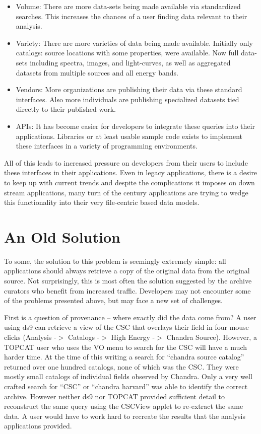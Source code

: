 \begin{itemize}

\item Volume: There are more data-sets being made available via standardized searches. This increases the chances of a user finding data relevant to their analysis. 
\item Variety:  There are more varieties of data being made available.  Initially only catalogs: source locations with some properties, were available.  Now full data-sets including spectra, images, and light-curves, as well as aggregated datasets from multiple sources and all energy bands.
\item Vendors: More organizations are publishing their data via these standard interfaces.  Also more individuals are publishing specialized datasets tied directly to their published work.
\item APIs: It has become easier for developers to integrate these queries into their applications.  Libraries or at least usable sample code exists to implement these interfaces in a variety of programming environments.

\end{itemize}

All of this leads to increased pressure on developers  from their users to include these interfaces in their applications. Even in legacy applications, there is a desire to keep up with current trends and despite the complications it imposes on down stream applications, many turn of the century applications are trying to wedge this functionality into their very file-centric based data models.



\section{An Old Solution}

To some, the solution to this problem is seemingly extremely simple:  all applications should always retrieve a copy of the original data from the original source.  Not surprisingly, this is most often the solution suggested by the archive curators who benefit from increased traffic. Developers may not encounter some of the problems presented above, but may face a new set of challenges.


First is a question of provenance -- where exactly did the data come from? A user using ds9 can retrieve a view of the CSC that overlays their field in four mouse clicks  (Analysis -$>$ Catalogs -$>$ High Energy -$>$ Chandra Source). However, a TOPCAT user who uses the VO menu to search for the CSC will have a much harder time.  At the time of this writing a search for  ``chandra source catalog'' returned over one hundred catalogs, none of which was the CSC.  They were mostly small catalogs of individual fields observed by Chandra.  Only a very well crafted search for ``CSC'' or ``chandra harvard'' was able to identify the correct archive.  However neither ds9 nor TOPCAT provided sufficient detail to reconstruct the same query using the CSCView applet to re-extract the same data.  A user would have to work hard to recreate the results that the analysis applications provided.

